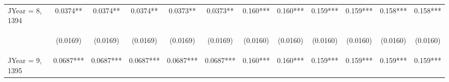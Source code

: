 \documentclass[]{article}
\begin{document}
\begin{center}
\begin{tabular}{lccccccccccc}
JYear = 8, 1394 & 0.0374** & 0.0374** & 0.0374** & 0.0373** & 0.0373** & 0.160*** & 0.160*** & 0.159*** & 0.159*** & 0.158*** & 0.158*** \\
\vspace{4pt} & \begin{footnotesize}(0.0169)\end{footnotesize} & \begin{footnotesize}(0.0169)\end{footnotesize} & \begin{footnotesize}(0.0169)\end{footnotesize} & \begin{footnotesize}(0.0169)\end{footnotesize} & \begin{footnotesize}(0.0169)\end{footnotesize} & \begin{footnotesize}(0.0160)\end{footnotesize} & \begin{footnotesize}(0.0160)\end{footnotesize} & \begin{footnotesize}(0.0160)\end{footnotesize} & \begin{footnotesize}(0.0160)\end{footnotesize} & \begin{footnotesize}(0.0160)\end{footnotesize} & \begin{footnotesize}(0.0160)\end{footnotesize} \\
JYear = 9, 1395 & 0.0687*** & 0.0687*** & 0.0687*** & 0.0687*** & 0.0687*** & 0.160*** & 0.160*** & 0.159*** & 0.159*** & 0.159*** & 0.159*** \\

\end{tabular}
\end{center}
\end{document}
